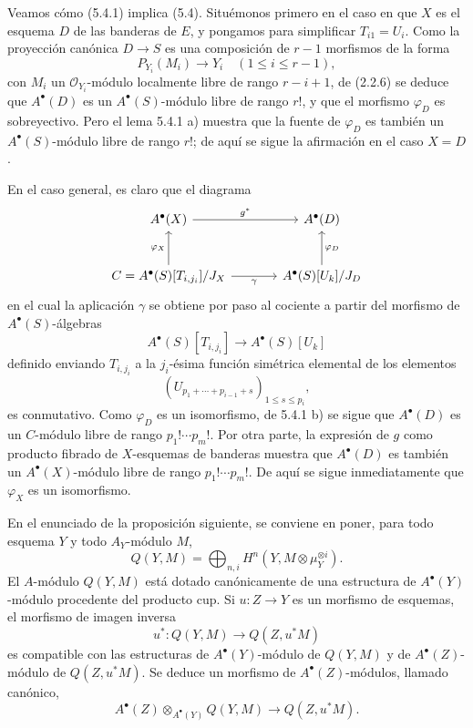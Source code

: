 Veamos cómo (5.4.1) implica (5.4). Situémonos primero en el caso en que $X$ es el esquema $D$ de las banderas de $E$, y pongamos para simplificar $T_{i1}=U_i$. Como la proyección canónica $D\to S$ es una composición de $r-1$ morfismos de la forma
\[
P_{Y_i}(M_i)\to Y_i\quad(1\le i\le r-1),
\]
con $M_i$ un $\mathcal O_{Y_i}$-módulo localmente libre de rango $r-i+1$, de (2.2.6) se deduce que $A^\bullet(D)$ es un $A^\bullet(S)$-módulo libre de rango $r!$, y que el morfismo $\varphi_D$ es sobreyectivo. Pero el lema 5.4.1 a) muestra que la fuente de $\varphi_D$ es también un $A^\bullet(S)$-módulo libre de rango $r!$; de aquí se sigue la afirmación en el caso $X=D$.

En el caso general, es claro que el diagrama
\[
\begin{tikzcd}[column sep=large,row sep=large]
A^\bullet(X) \arrow[r,"g^*"] & A^\bullet(D)\\
C=A^\bullet(S)[T_{i,j_i}]/J_X \arrow[u,"\varphi_X"] \arrow[r,"\gamma"'] &
A^\bullet(S)[U_k]/J_D \arrow[u,"\varphi_D"']
\end{tikzcd}
\]
en el cual la aplicación $\gamma$ se obtiene por paso al cociente a partir del morfismo de $A^\bullet(S)$-álgebras
\[
A^\bullet(S)[T_{i,j_i}]\to A^\bullet(S)[U_k]
\]
definido enviando $T_{i,j_i}$ a la $j_i$-ésima función simétrica elemental de los elementos
\[
(U_{p_1+\cdots+p_{i-1}+s})_{1\le s\le p_i},
\]
es conmutativo. Como $\varphi_D$ es un isomorfismo, de 5.4.1 b) se sigue que $A^\bullet(D)$ es un $C$-módulo libre de rango $p_1!\cdots p_m!$. Por otra parte, la expresión de $g$ como producto fibrado de $X$-esquemas de banderas muestra que $A^\bullet(D)$ es también un $A^\bullet(X)$-módulo libre de rango $p_1!\cdots p_m!$. De aquí se sigue inmediatamente que $\varphi_X$ es un isomorfismo.

En el enunciado de la proposición siguiente, se conviene en poner, para todo esquema $Y$ y todo $A_Y$-módulo $M$,
\[
Q(Y,M)=\bigoplus_{n,i}H^n(Y,M\otimes\mu_Y^{\otimes i}).
\]
El $A$-módulo $Q(Y,M)$ está dotado canónicamente de una estructura de $A^\bullet(Y)$-módulo procedente del producto cup. Si $u:Z\to Y$ es un morfismo de esquemas, el morfismo de imagen inversa
\[
u^*:Q(Y,M)\to Q(Z,u^*M)
\]
es compatible con las estructuras de $A^\bullet(Y)$-módulo de $Q(Y,M)$ y de $A^\bullet(Z)$-módulo de $Q(Z,u^*M)$. Se deduce un morfismo de $A^\bullet(Z)$-módulos, llamado canónico,
\[
A^\bullet(Z)\otimes_{A^\bullet(Y)}Q(Y,M)\to Q(Z,u^*M).
\]

